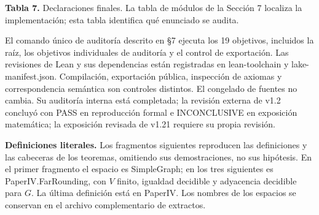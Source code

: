 \documentclass[spanish,11pt,a4paper]{article}
\begin{document}
\textbf{Tabla 7.} Declaraciones finales. La tabla de módulos de la Sección 7 localiza la implementación; esta tabla identifica qué enunciado se audita.

El comando único de auditoría descrito en §7 ejecuta los 19 objetivos, incluidos la raíz, los objetivos individuales de auditoría y el control de exportación. Las revisiones de Lean y sus dependencias están registradas en lean-toolchain y lake-manifest.json. Compilación, exportación pública, inspección de axiomas y correspondencia semántica son controles distintos. El congelado de fuentes no cambia. Su auditoría interna está completada; la revisión externa de v1.2 concluyó con PASS en reproducción formal e INCONCLUSIVE en exposición matemática; la exposición revisada de v1.21 requiere su propia revisión.

\textbf{Definiciones literales.} Los fragmentos siguientes reproducen las definiciones y las cabeceras de los teoremas, omitiendo sus demostraciones, no sus hipótesis. En el primer fragmento el espacio es {\ttfamily\small SimpleGraph}; en los tres siguientes es {\ttfamily\small PaperIV.\discretionary{\hbox{\ensuremath{\hookrightarrow}}}{}{}FarRounding}, con \(V\) finito, igualdad decidible y adyacencia decidible para \(G\). La última definición está en {\ttfamily\small PaperIV}. Los nombres de los espacios se conservan en el archivo complementario de extractos.
\end{document}
